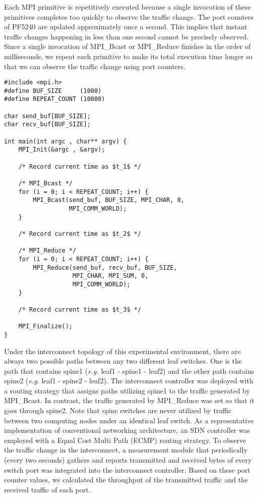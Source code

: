 Each MPI primitive is repetitively executed because a single invocation
of these primitives completes too quickly to observe the traffic change.
The port counters of PF5240 are updated approximately once a second.
This implies that instant traffic changes happening in less than one
second cannot be precisely observed. Since a single invocation of
MPI\_Bcast or MPI\_Reduce finishes in the order of milliseconds, we
repeat each primitive to make its total execution time longer so that we
can observe the traffic change using port counters.

\begin{lstlisting}[caption={Source code of MPI application}, float=htbp, label=lst:sync-mpi-app]
#include <mpi.h>
#define BUF_SIZE     (1000)
#define REPEAT_COUNT (10000)

char send_buf[BUF_SIZE];
char recv_buf[BUF_SIZE];

int main(int argc , char** argv) {
    MPI_Init(&argc , &argv);

    /* Record current time as $t_1$ */

    /* MPI_Bcast */
    for (i = 0; i < REPEAT_COUNT; i++) {
        MPI_Bcast(send_buf, BUF_SIZE, MPI_CHAR, 0,
                  MPI_COMM_WORLD);
    }

    /* Record current time as $t_2$ */

    /* MPI_Reduce */
    for (i = 0; i < REPEAT_COUNT; i++) {
        MPI_Reduce(send_buf, recv_buf, BUF_SIZE,
                   MPI_CHAR, MPI_SUM, 0,
                   MPI_COMM_WORLD);
    }

    /* Record current time as $t_3$ */

    MPI_Finalize();
}
\end{lstlisting}

Under the interconnect topology of this experimental environment, there
are always two possible paths between any two different leaf switches.
One is the path that contains spine1 (\emph{e.g.} leaf1 - spine1 -
leaf2) and the other path contains spine2 (\emph{e.g.} leaf1 - spine2 -
leaf2). The interconnect controller was deployed with a routing strategy
that assigns paths utilizing spine1 to the traffic generated by
MPI\_Bcast. In contrast, the traffic generated by MPI\_Reduce was set so
that it goes through spine2. Note that spine switches are never utilized
by traffic between two computing nodes under an identical leaf switch.
As a representative implementation of conventional networking
architecture, an SDN controller was employed with a Equal Cost Multi
Path (ECMP) routing strategy. To observe the traffic change in the
interconnect, a measurement module that periodically (every two seconds)
gathers and reports transmitted and received bytes of every switch port
was integrated into the interconnect controller. Based on these port
counter values, we calculated the throughput of the transmitted traffic
and the received traffic of each port.

